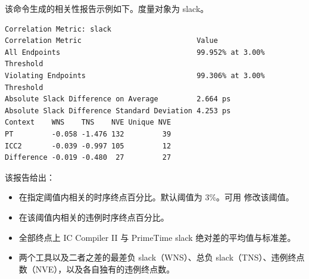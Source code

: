 该命令生成的相关性报告示例如下。度量对象为 slack。
\begin{lstlisting}
Correlation Metric: slack
Correlation Metric                           Value
All Endpoints                                99.952% at 3.00% Threshold
Violating Endpoints                          99.306% at 3.00% Threshold
Absolute Slack Difference on Average         2.664 ps
Absolute Slack Difference Standard Deviation 4.253 ps
Context    WNS    TNS    NVE Unique NVE
PT         -0.058 -1.476 132         39
ICC2       -0.039 -0.997 105         12
Difference -0.019 -0.480  27         27
\end{lstlisting}

该报告给出：
\begin{itemize}
  \item 在指定阈值内相关的时序终点百分比。默认阈值为 3\%。可用  修改该阈值。
  \item 在该阈值内相关的违例时序终点百分比。
  \item 全部终点上 IC Compiler II 与 PrimeTime slack 绝对差的平均值与标准差。
  \item 两个工具以及二者之差的最差负 slack（WNS）、总负 slack（TNS）、违例终点数（NVE），以及各自独有的违例终点数。
\end{itemize}
